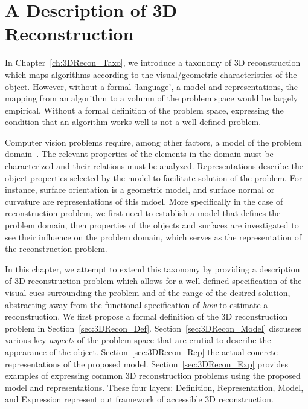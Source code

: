 
\chapter{A Description of 3D Reconstruction}
\label{ch:3DRecon_Desc}
In Chapter~\ref{ch:3DRecon_Taxo}, we introduce a taxonomy of 3D reconstruction which maps algorithms according to the visual/geometric characteristics of the object. However, without a formal `language', \ie a model and representations, the mapping from an algorithm to a volumn of the problem space would be largely empirical. Without a formal definition of the problem space, expressing the condition that an algorithm works well is not a well defined problem.

Computer vision problems require, among other factors, a model of the problem domain~\cite{little1985phdthesis}. The relevant properties of the elements in the domain must be characterized and their relations must be analyzed. Representations describe the object properties selected by the model to facilitate solution of the problem. For instance, surface orientation is a geometric model, and surface normal or curvature are representations of this mdoel. More specifically in the case of reconstruction problem, we first need to establish a model that defines the problem domain, then properties of the objects and surfaces are investigated to see their influence on the problem domain, which serves as the representation of the reconstruction problem.

In this chapter, we attempt to extend this taxonomy by providing a description of 3D reconstruction problem which allows for a well defined specification of the visual cues surrounding the problem and of the range of the desired solution, abstracting away from the functional specification of \textit{how} to estimate a reconstruction. We first propose a formal definition of the 3D reconstruction problem in Section~\ref{sec:3DRecon_Def}. Section~\ref{sec:3DRecon_Model} discusses various key \textit{aspects} of the problem space that are crutial to describe the appearance of the object. Section~\ref{sec:3DRecon_Rep} the actual concrete representations of the proposed model. Section~\ref{sec:3DRecon_Exp} provides examples of expressing common 3D reconstruction problems using the proposed model and representations. These four layers: Definition, Representation, Model, and Expression represent out framework of accessible 3D reconstruction.

